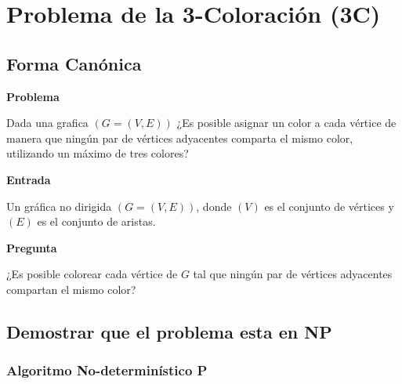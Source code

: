 \section{Problema de la 3-Coloración (3C)}

\subsection{\textcolor{Contraste4}{Forma Canónica}}

\begin{myitemize}

    \item \textbf{Problema} 
    
    Dada una grafica $(G = (V, E))$ ¿Es posible asignar un color a cada vértice de manera que ningún 
    par de vértices adyacentes comparta el mismo color, utilizando un máximo de tres colores?
    
    \item \textbf{Entrada}
    
    Un gráfica no dirigida $( G = (V, E) )$, donde $(V)$ es el conjunto de vértices y $(E)$ es el 
    conjunto de aristas.

    \item \textbf{Pregunta}
    
    ¿Es posible colorear cada vértice de $G$ tal que ningún par de vértices adyacentes compartan el mismo color?
\end{myitemize}

\subsection{\textcolor{Contraste4}{Demostrar que el problema esta en NP}}

\subsubsection*{\textcolor{Contraste3}{Algoritmo No-determinístico P}}

